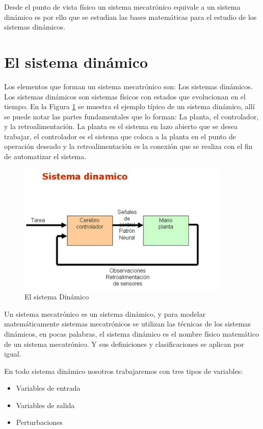 \documentclass[12pt]{book}
\theoremstyle{definition}
\theoremstyle{remark}
\theoremstyle{plain}
\begin{document}
Desde el punto de vista físico un sistema mecatrónico equivale a un sistema dinámico es por ello que se estudian las bases matemáticas para el estudio de los sistemas dinámicos.

\section{El sistema dinámico}

Los elementos que forman un sistema mecatrónico son: Los sistemas dinámicos. Los sistemas dinámicos son sistemas físicos con estados que evolucionan en el tiempo. En la Figura \ref{fig6} se muestra el ejemplo típico de un sistema dinámico, allí se puede notar las partes fundamentales que lo forman: La planta, el controlador, y la retroalimentación. La planta es el sistema en lazo abierto que se desea trabajar, el controlador es el sistema que coloca a la planta en el punto de operación deseado y la retroalimentación es la conexión que se realiza  con el fin de automatizar el sistema.

\begin{figure}
\centering
\includegraphics[width=4in]{sistemadinamico.jpg}
\caption{El sistema Dinámico}
\label{fig6}
\end{figure}

Un sistema mecatrónico es un sistema dinámico, y para modelar matemáticamente sistemas mecatrónicos se utilizan las técnicas de los sistemas dinámicos, en pocas palabras, el sistema dinámico es el nombre físico matemático de un sistema mecatrónico. Y sus definiciones y clasificaciones se aplican por igual.

En todo sistema dinámico nosotros trabajaremos con tres tipos de variables:
\begin{itemize}
\item Variables de entrada
\item Variables de salida
\item Perturbaciones
\end{itemize}
\end{document}

